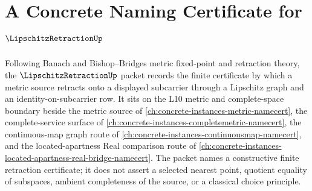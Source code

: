 \chapter{A Concrete Naming Certificate for $\LipschitzRetractionUp$}
\label{ch:concrete-instances-lipschitz-retraction-namecert}

Following Banach and Bishop--Bridges metric fixed-point and retraction theory, the $\LipschitzRetractionUp$ packet records the finite certificate by which a metric source retracts onto a displayed subcarrier through a Lipschitz graph and an identity-on-subcarrier row. It sits on the L10 metric and complete-space boundary beside the metric source of \autoref{ch:concrete-instances-metric-namecert}, the complete-service surface of \autoref{ch:concrete-instances-completemetric-namecert}, the continuous-map graph route of \autoref{ch:concrete-instances-continuousmap-namecert}, and the located-apartness Real comparison route of \autoref{ch:concrete-instances-located-apartness-real-bridge-namecert}. The packet names a constructive finite retraction certificate; it does not assert a selected nearest point, quotient equality of subspaces, ambient completeness of the source, or a classical choice principle.

